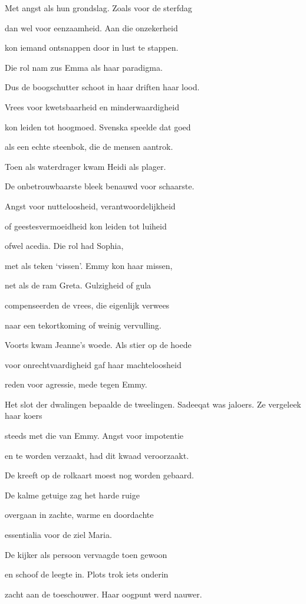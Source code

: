 Met angst als hun grondslag.
Zoals voor de sterfdag

dan wel voor eenzaamheid.
Aan die onzekerheid

kon iemand ontsnappen
door in lust te stappen.

Die rol nam zus Emma
als haar paradigma.

Dus de boogschutter schoot
in haar driften haar lood.

Vrees voor kwetsbaarheid
en minderwaardigheid

kon leiden tot hoogmoed.
Svenska speelde dat goed

als een echte steenbok,
die de mensen aantrok.

Toen als waterdrager
kwam Heidi als plager.

De onbetrouwbaarste
bleek benauwd voor schaarste.

Angst voor nutteloosheid,
verantwoordelijkheid

of geestesvermoeidheid
kon leiden tot luiheid

ofwel acedia.
Die rol had Sophia,

met als teken ‘vissen’.
Emmy kon haar missen,

net als de ram Greta.
Gulzigheid of gula

compenseerden de vrees,
die eigenlijk verwees

naar een tekortkoming
of weinig vervulling.

Voorts kwam Jeanne’s woede.
Als stier op de hoede

voor onrechtvaardigheid
gaf haar machteloosheid

reden voor agressie,
mede tegen Emmy.

Het slot der dwalingen
bepaalde de tweelingen.
Sadeeqat was jaloers.
Ze vergeleek haar koers

steeds met die van Emmy.
Angst voor impotentie

en te worden verzaakt,
had dit kwaad veroorzaakt.

De kreeft op de rolkaart
moest nog worden gebaard.

De kalme getuige
zag het harde ruige

overgaan in zachte,
warme en doordachte

essentialia
voor de ziel Maria.

De kijker als persoon
vervaagde toen gewoon

en schoof de leegte in.
Plots trok iets onderin

zacht aan de toeschouwer.
Haar oogpunt werd nauwer.

